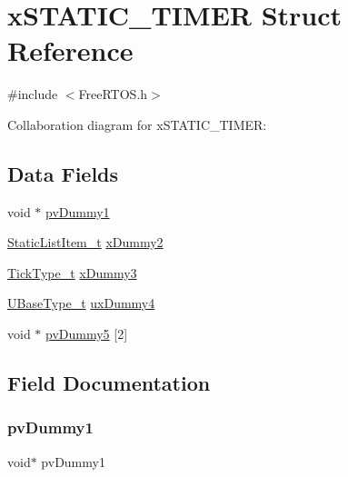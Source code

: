 \hypertarget{structx_s_t_a_t_i_c___t_i_m_e_r}{}\section{x\+S\+T\+A\+T\+I\+C\+\_\+\+T\+I\+M\+ER Struct Reference}
\label{structx_s_t_a_t_i_c___t_i_m_e_r}


{\ttfamily \#include $<$Free\+R\+T\+O\+S.\+h$>$}



Collaboration diagram for x\+S\+T\+A\+T\+I\+C\+\_\+\+T\+I\+M\+ER\+:
\subsection*{Data Fields}
\begin{DoxyCompactItemize}
\item 
void $\ast$ \hyperlink{structx_s_t_a_t_i_c___t_i_m_e_r_a6d34686c479f85ca81b1c8b8d63de30f}{pv\+Dummy1}
\item 
\hyperlink{_free_r_t_o_s_8h_a1d31bc0472385a87424518da484d9e09}{Static\+List\+Item\+\_\+t} \hyperlink{structx_s_t_a_t_i_c___t_i_m_e_r_af110422a11e634c23400ce5d10bd8b7f}{x\+Dummy2}
\item 
\hyperlink{portmacro_8h_aa69c48c6e902ce54f70886e6573c92a9}{Tick\+Type\+\_\+t} \hyperlink{structx_s_t_a_t_i_c___t_i_m_e_r_ac1b972afc468f0e753a25442242e6137}{x\+Dummy3}
\item 
\hyperlink{portmacro_8h_a646f89d4298e4f5afd522202b11cb2e6}{U\+Base\+Type\+\_\+t} \hyperlink{structx_s_t_a_t_i_c___t_i_m_e_r_a26be05b0990c51a2754226b559ab6550}{ux\+Dummy4}
\item 
void $\ast$ \hyperlink{structx_s_t_a_t_i_c___t_i_m_e_r_abae37cf280ed6295ec4169577ad19250}{pv\+Dummy5} \mbox{[}2\mbox{]}
\end{DoxyCompactItemize}


\subsection{Field Documentation}
\mbox{\label{structx_s_t_a_t_i_c___t_i_m_e_r_a6d34686c479f85ca81b1c8b8d63de30f}} 
\subsubsection{\texorpdfstring{pv\+Dummy1}{pvDummy1}}
{\footnotesize\ttfamily void$\ast$ pv\+Dummy1}

